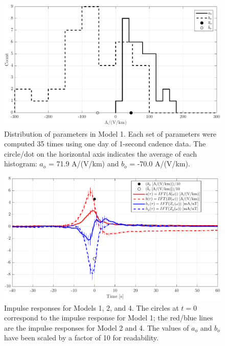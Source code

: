 \documentclass[draft,linenumbers]{agujournal2018}
\begin{document}
\begin{figure}[h]
\centering
\includegraphics[width=\textwidth]{figures/plot_TF_aves_aobo_histograms-options-1.pdf}
\caption{Distribution of parameters in Model 1. Each set of parameters were computed 35 times using one day of 1-second cadence data. The circle/dot on the horizontal axis indicates the average of each histogram: $a_o$ = 71.9 A/(V/km) and $b_o$ = -70.0 A/(V/km).}
\label{histogram}
\end{figure}

\begin{figure}[h]
\centering
\includegraphics[width=\textwidth]{figures/plot_TF_aves_H-options-1.pdf}
\caption{Impulse responses for Models 1, 2, and 4. The circles at $t = 0$ correspond to the impulse response for Model 1; the red/blue lines are the impulse responses for Model 2 and 4. The values of $a_o$ and $b_o$ have been scaled by a factor of 10 for readability.}
\label{H}
\end{figure}
\end{document}
